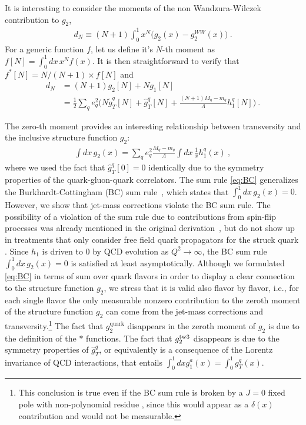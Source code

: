 \documentclass[preprintnumbers,floatfix,nofootinbib]{revtex4}
\newcommand{\mj}{M_q}
\newcommand{\mq}{m_q}
\begin{document}
It is interesting to consider the moments of the non Wandzura-Wilczek contribution to $g_2$,
\begin{align}
  d_N \equiv (N+1) \int_0^1 x^N \bigg( g_2(x) - g_2^{WW}(x) \bigg) \ .
\end{align}
For a generic function $f$, let us define it's $N$-th moment as $f[N]=\int_0^1 dx\, x^{N} f(x)$. It is then straightforward to verify that $f^*[N] = N/(N+1) \times f[N]$ and  
\begin{align}
  d_N & = (N+1) g_2[N] + N g_1[N] \\
  & = \frac12 \sum_q e_q^2 \bigg( N \tilde g_T^q[N] + \hat g_T^q[N]
    + \frac{(N+1) M_q-m_q}{\Lambda} h_1^q[N] \bigg) \ .
\end{align}

The zero-th moment provides an interesting relationship between transversity
and the inclusive structure function $g_2$:
\begin{align}
  \label{eq:BC}
  \int dx\, g_2(x) = \sum_q e_q^2 \frac{\mj-\mq}{\Lambda} \int dx\, \frac{1}{x} h_1^q(x) \ ,
\end{align}
where we used the fact that $\hat g_T^q[0]=0$ identically due to the symmetry
properties of the quark-gluon-quark correlators. 
The sum rule \eqref{eq:BC}
generalizes the Burkhardt-Cottingham (BC) sum rule~\cite{Burkhardt:1970ti},
which states that  $\int_0^1 dx\, g_2(x) =0$. 
However, we show that jet-mass corrections violate the BC sum rule. The
possibility of a violation of the sum rule due to 
contributions from spin-flip
processes was already mentioned in the original
derivation~\cite{Burkhardt:1970ti}, 
but do not show up in treatments that only
consider free field quark propagators for the struck quark
\cite{Jaffe:1996zw}. Since $h_1$ is driven to 0 by QCD evolution as $Q^2 \to
\infty$, the BC sum rule $\int_0^1 dx\, g_2(x) =0$ is satisfied at least
asymptotically. Although we formulated \eqref{eq:BC} in terms of sum over quark flavors in order to display a clear
connection to the structure function $g_2$, we stress that it is valid also
flavor by flavor, i.e., for each single flavor the only measurable nonzero contribution to the zeroth moment of the
structure function $g_2$ can come from the jet-mass
corrections and transversity.\footnote{This conclusion is true even if the BC sum rule is broken by a $J = 0$ fixed pole with
non-polynomial residue \cite{Jaffe:1996zw}, since this would appear as a
$\delta(x)$ contribution and would not be measurable.}
The fact that $g_2^{\text{quark}}$ disappears in the zeroth moment
of $g_2$ is due to the definition of the $\ast$ functions. The fact that $g_2^{\rm tw3}$
disappears is due to the symmetry properties of $\widehat{g}_T^q$, or
equivalently  is a consequence of the
Lorentz invariance of QCD interactions, that entails $\int_0^1 dx g_1^a(x) =
\int_0^1 g_T^q(x)$.
\end{document}
